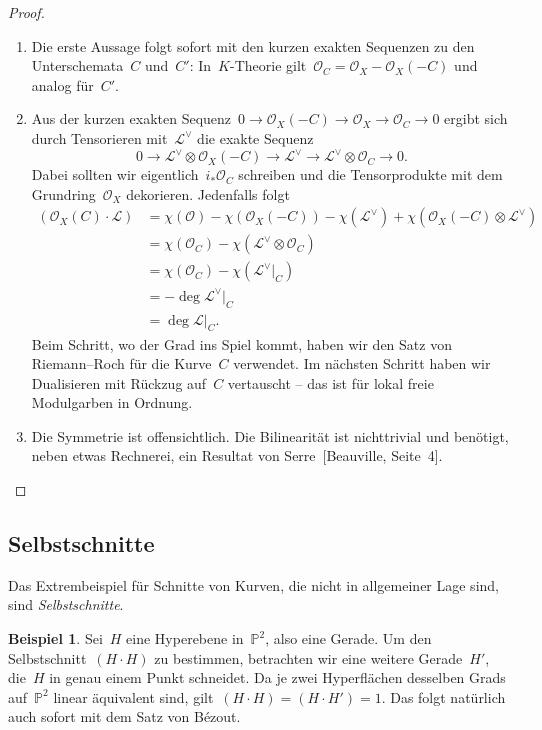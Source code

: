 \documentclass[a4paper,ngerman,12pt]{scrartcl}
\theoremstyle{definition}
\newtheorem{ex}[defn]{Beispiel}
\theoremstyle{plain}
\theoremstyle{remark}
\newcommand{\PP}{\mathbb{P}}
\renewcommand{\L}{\mathcal{L}}
\renewcommand{\O}{\mathcal{O}}
\newcommand{\lra}{\longrightarrow}
\begin{document}
\begin{proof}
\begin{enumerate}
\item Die erste Aussage folgt sofort mit den kurzen exakten Sequenzen zu den
Unterschemata~$C$ und~$C'$: In~$K$-Theorie gilt~$\O_C = \O_X - \O_X(-C)$ und
analog für~$C'$.
\item Aus der kurzen exakten Sequenz~$0 \to \O_X(-C) \to \O_X \to \O_C \to 0$
ergibt sich durch Tensorieren mit~$\L^\vee$ die exakte Sequenz
\[ 0 \lra \L^\vee \otimes \O_X(-C) \lra \L^\vee \lra \L^\vee \otimes \O_C \lra 0. \]
Dabei sollten wir eigentlich~$i_* \O_C$ schreiben und die Tensorprodukte mit
dem Grundring~$\O_X$ dekorieren. Jedenfalls folgt
\begin{align*}
  (\O_X(C) \cdot \L)
  &= \chi(\O) - \chi(\O_X(-C)) - \chi(\L^\vee) + \chi(\O_X(-C) \otimes \L^\vee) \\
  &= \chi(\O_C) - \chi(\L^\vee \otimes \O_C) \\
  &= \chi(\O_C) - \chi(\L^\vee|_C) \\
  &= -\deg \L^\vee|_C \\
  &= \deg \L|_C.
\end{align*}
Beim Schritt, wo der Grad ins Spiel kommt, haben wir den Satz von Riemann--Roch
für die Kurve~$C$ verwendet. Im nächsten Schritt haben wir Dualisieren mit
Rückzug auf~$C$ vertauscht -- das ist für lokal freie Modulgarben in Ordnung.
\item Die Symmetrie ist offensichtlich. Die Bilinearität ist nichttrivial und
benötigt, neben etwas Rechnerei, ein Resultat von Serre~[Beauville, Seite~4]. \qedhere
\end{enumerate}
\end{proof}


\subsection*{Selbstschnitte}

Das Extrembeispiel für Schnitte von Kurven, die nicht in allgemeiner Lage sind,
sind \emph{Selbstschnitte}.

\begin{ex}Sei~$H$ eine Hyperebene in~$\PP^2$, also eine Gerade. Um den
Selbstschnitt~$(H \cdot H)$ zu bestimmen, betrachten wir eine weitere
Gerade~$H'$, die~$H$ in genau einem Punkt schneidet. Da je zwei Hyperflächen
desselben Grads auf~$\PP^2$ linear äquivalent sind, gilt~$(H \cdot H) = (H \cdot H') = 1$.
Das folgt natürlich auch sofort mit dem Satz von Bézout.
\end{ex}
\end{document}
